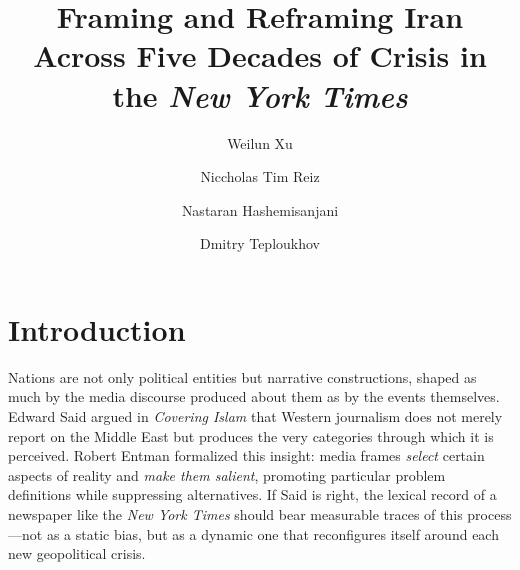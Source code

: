 \documentclass{dhnbpub}
\begin{document}

\title{Framing and Reframing Iran Across Five Decades of Crisis in the \textit{New York Times}}


\author{Weilun Xu}
\author{Niccholas Tim Reiz}
\author{Nastaran Hashemisanjani}
\author{Dmitry Teploukhov}
\address{EPFL, Lausanne, Switzerland}



\maketitle

\section{Introduction}
Nations are not only political entities but narrative constructions, shaped as much by the media discourse produced about them as by the events themselves. Edward Said argued in \emph{Covering Islam} \citep{Said1981} that Western journalism does not merely report on the Middle East but produces the very categories through which it is perceived. Robert Entman \citep{Entman1993} formalized this insight: media frames \emph{select} certain aspects of reality and \emph{make them salient}, promoting particular problem definitions while suppressing alternatives. If Said is right, the lexical record of a newspaper like the \textit{New York Times} should bear measurable traces of this process---not as a static bias, but as a dynamic one that reconfigures itself around each new geopolitical crisis.
\end{document}

